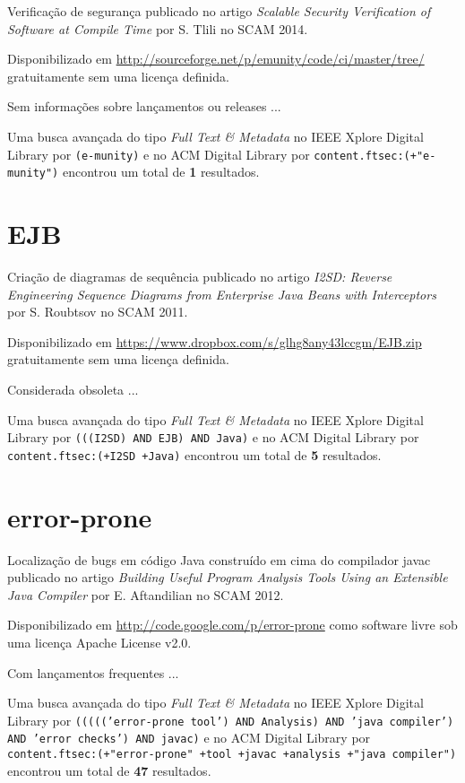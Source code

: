 Verificação de segurança
publicado no artigo {\it Scalable Security Verification of Software at Compile Time}
por S. Tlili
no SCAM 2014.

Disponibilizado em \url{http://sourceforge.net/p/emunity/code/ci/master/tree/}
gratuitamente
sem uma licença definida.

Sem informações sobre lançamentos ou releases ...


Uma busca avançada do tipo {\it Full Text \& Metadata} no IEEE Xplore Digital Library por
\texttt{(e-munity)}
e no ACM Digital Library por
\texttt{content.ftsec:(+"e-munity")}
encontrou um total de
{\bf 1}
resultados.

\section{EJB}

Criação de diagramas de sequência
publicado no artigo {\it I2SD: Reverse Engineering Sequence Diagrams from Enterprise Java Beans with Interceptors}
por S. Roubtsov
no SCAM 2011.

Disponibilizado em \url{https://www.dropbox.com/s/glhg8any43lccgm/EJB.zip}
gratuitamente
sem uma licença definida.

Considerada obsoleta ...


Uma busca avançada do tipo {\it Full Text \& Metadata} no IEEE Xplore Digital Library por
\texttt{(((I2SD) AND EJB) AND Java)}
e no ACM Digital Library por
\texttt{content.ftsec:(+I2SD +Java)}
encontrou um total de
{\bf 5}
resultados.

\section{error-prone}

Localização de bugs em código Java construído em cima do compilador javac
publicado no artigo {\it Building Useful Program Analysis Tools Using an Extensible Java Compiler}
por E. Aftandilian
no SCAM 2012.

Disponibilizado em \url{http://code.google.com/p/error-prone}
como software livre
sob uma licença Apache License v2.0.

Com lançamentos frequentes ...


Uma busca avançada do tipo {\it Full Text \& Metadata} no IEEE Xplore Digital Library por
\texttt{((((('error-prone tool') AND Analysis) AND 'java compiler') AND 'error checks') AND javac)}
e no ACM Digital Library por
\texttt{content.ftsec:(+"error-prone" +tool +javac +analysis +"java compiler")}
encontrou um total de
{\bf 47}
resultados.


